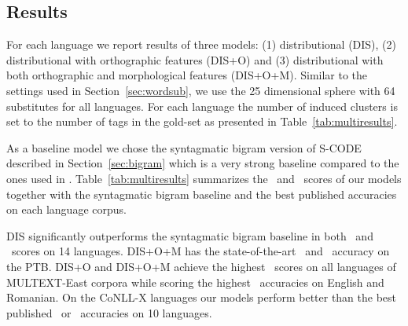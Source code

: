\subsection{Results}
\label{sec:multires}

For each language we report results of three models: (1)
distributional (DIS), (2) distributional with orthographic features
(DIS+O) and (3) distributional with both orthographic and
morphological features (DIS+O+M).  Similar to the settings used in
Section~\ref{sec:wordsub}, we use the 25 dimensional sphere with 64
substitutes for all languages.  For each language the number of induced
clusters is set to the number of tags in the gold-set as presented in
Table~\ref{tab:multiresults}.

As a baseline model we chose the syntagmatic bigram version of S-CODE
described in Section~\ref{sec:bigram} which is a very strong baseline
compared to the ones used in
\cite{christodoulopoulos-goldwater-steedman:2011:EMNLP}.
Table~\ref{tab:multiresults} summarizes the \mto\ and \vm\ scores of our
models together with the syntagmatic bigram baseline and the best
published accuracies on each language corpus.

DIS significantly outperforms the syntagmatic bigram baseline in both
\mto\ and \vm\ scores on 14 languages.  DIS+O+M has the
state-of-the-art \mto\ and \vm\ accuracy on the PTB.  DIS+O and
DIS+O+M achieve the highest \mto\ scores on all languages of
MULTEXT-East corpora while scoring the highest \vm\ accuracies on
English and Romanian.  On the CoNLL-X languages our models perform
better than the best published \mto\ or \vm\ accuracies on 10
languages.

